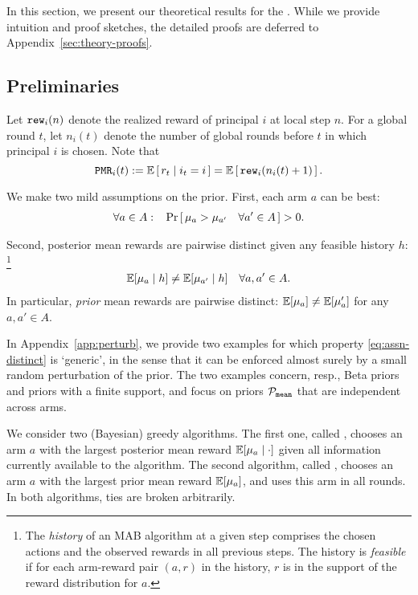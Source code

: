 
In this section, we present our theoretical results for the \TheoryModel. While we provide intuition and proof sketches, the detailed proofs are deferred to Appendix~\ref{sec:theory-proofs}.

\subsection{Preliminaries}
\label{sec:theory-prelims}

 Let $\mathtt{rew}_i(n)$ denote the realized reward of principal $i$ at local step $n$. For a global round $t$, let $n_i(t)$ denote the number of global rounds before $t$ in which principal $i$ is chosen. Note that
    \[ \PMR_i(t):=  \E\sbr{ r_t\mid i_t = i }
        = \E\sbr{ \rew_i(n_i(t)+1) }. \]

 We make two mild assumptions on the prior. First, each arm $a$ can be best:
\begin{align}\label{eq:assn-prob}
\forall a\in A:\;\;\;
\Pr\left[\,\mu_a  > \mu_{a'}
\quad \forall a'\in A\,\right]
> 0.
\end{align}

\noindent Second, posterior mean rewards are pairwise distinct given any feasible history $h$:%
\footnote{The \emph{history} of an MAB algorithm at a given step
  comprises the chosen actions and the observed rewards in all
  previous steps. The history is \emph{feasible} if for each arm-reward pair $(a,r)$ in the history, $r$ is in the support of the reward distribution for $a$.}
\begin{align}\label{eq:assn-distinct}
    \E[\mu_a \mid h] \neq \E[\mu_{a'}\mid h] \quad \forall a,a'\in A.
\end{align}
In particular, \emph{prior} mean rewards are pairwise distinct:
$\E[\mu_a] \neq \E[\mu_a']$ for any $a,a'\in A$.

In Appendix~\ref{app:perturb}, we provide two examples for which property \eqref{eq:assn-distinct} is `generic', in the sense that it can be enforced almost surely by a small random perturbation of the prior. The two examples concern, resp., Beta priors and priors with a finite support, and focus on priors $\mathcal{P}_\mathtt{mean}$ that are independent across arms.

We consider two (Bayesian) greedy algorithms. The first one, called  \DynGreedy, chooses an arm $a$ with the largest posterior mean reward $\E[\mu_a \mid \cdot ]$ given all information currently available to the algorithm. The second algorithm, called \StaticGreedy, chooses an arm $a$ with the largest prior mean reward $\E[\mu_a]$, and uses this arm in all rounds. In both algorithms, ties are broken arbitrarily.


